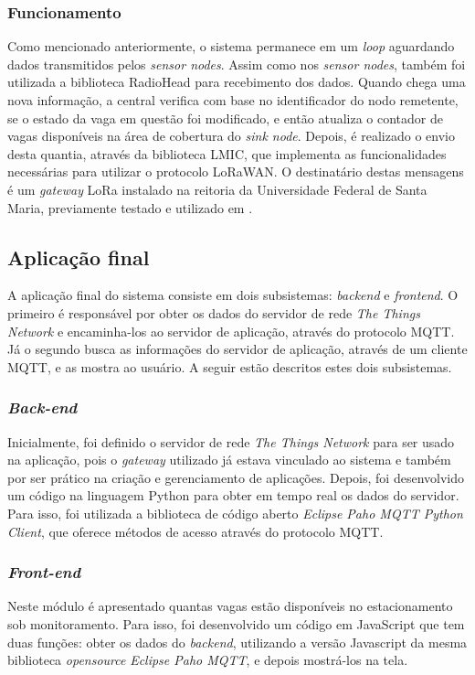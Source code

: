 \documentclass[oneside,openright,12pt]{ufsm_2015} %
\begin{document}
    \subsubsection{Funcionamento}
    Como mencionado anteriormente, o sistema permanece em um \textit{loop} aguardando dados transmitidos pelos \textit{sensor nodes}.
    Assim como nos \textit{sensor nodes}, também foi utilizada a biblioteca RadioHead para recebimento dos dados. Quando chega uma nova informação, a central verifica com base no identificador do nodo remetente, se o estado da vaga em questão foi modificado, e então atualiza o contador de vagas disponíveis na área de cobertura do \textit{sink node}. Depois, é realizado o envio desta quantia, através da biblioteca LMIC, que implementa as funcionalidades necessárias para utilizar o protocolo LoRaWAN. O destinatário destas mensagens é um \textit{gateway} LoRa instalado na reitoria da Universidade Federal de Santa Maria, previamente testado e utilizado em \cite{tcc:matheus-neis}.
    
    
    \subsection{Aplicação final}
    A aplicação final do sistema consiste em dois subsistemas: \textit{backend} e \textit{frontend}. O primeiro é responsável por obter os dados do servidor de rede \textit{The Things Network} e encaminha-los ao servidor de aplicação, através do protocolo MQTT. Já o segundo busca as informações do servidor de aplicação, através de um cliente MQTT, e as mostra ao usuário.
    A seguir estão descritos estes dois subsistemas.
    
    \subsubsection{\textit{Back-end}}
    Inicialmente, foi definido o servidor de rede \textit{The Things Network} para ser usado na aplicação, pois o \textit{gateway} utilizado já estava vinculado ao sistema e também por ser prático na criação e gerenciamento de aplicações. Depois, foi desenvolvido um código na linguagem Python para obter em tempo real os dados do servidor. Para isso, foi utilizada a biblioteca de código aberto \textit{Eclipse Paho MQTT Python Client}, que oferece métodos de acesso através do protocolo MQTT. 
    
    \subsubsection{\textit{Front-end}}
    Neste módulo é apresentado quantas vagas estão disponíveis no estacionamento sob monitoramento. Para isso, foi desenvolvido um código em JavaScript que tem duas funções: obter os dados do \textit{backend}, utilizando a versão Javascript da mesma biblioteca \textit{opensource} \textit{Eclipse Paho MQTT}, e depois mostrá-los na tela. 
    
\end{document}
